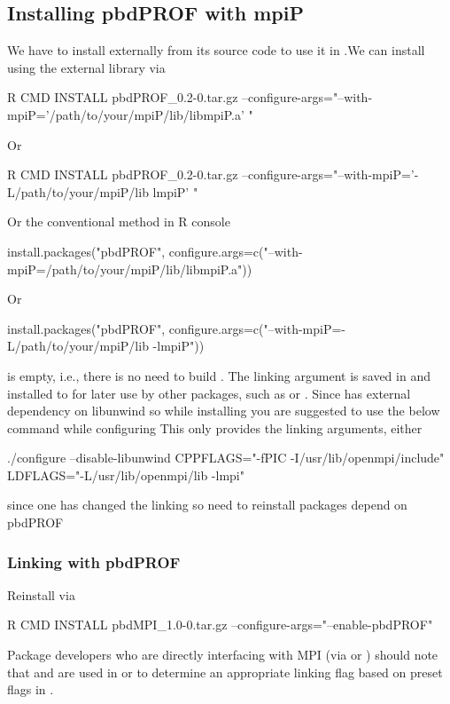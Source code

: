 \subsection{Installing pbdPROF with mpiP}
\label{sec:mpiP}

We have to install  externally from its source code to use it in
.We can install  using the external  library via
\begin{Command}
R CMD INSTALL pbdPROF_0.2-0.tar.gz --configure-args="--with-mpiP='/path/to/your/mpiP/lib/libmpiP.a' "
\end{Command}
Or
\begin{Command}
R CMD INSTALL pbdPROF_0.2-0.tar.gz --configure-args="--with-mpiP='-L/path/to/your/mpiP/lib lmpiP' "
\end{Command}
Or the conventional method in R console
\begin{Command}
install.packages("pbdPROF", configure.args=c("--with-mpiP=/path/to/your/mpiP/lib/libmpiP.a"))
\end{Command}
Or
\begin{Command}
install.packages("pbdPROF", configure.args=c("--with-mpiP=-L/path/to/your/mpiP/lib -lmpiP"))
\end{Command}


 is empty, i.e., there is no need to build .
The linking argument is saved in  and installed to
 for later use by other packages, such as  or .
Since  has external dependency  on libunwind so while installing 
 you are suggested to use the below command while configuring 
This only provides the linking arguments, either
\begin{Code}
./configure --disable-libunwind CPPFLAGS="-fPIC -I/usr/lib/openmpi/include" LDFLAGS="-L/usr/lib/openmpi/lib -lmpi"
\end{Code}
since one has changed the linking so need to reinstall packages depend on pbdPROF



\subsubsection{Linking  with pbdPROF}
\label{sec:pbdMPI}

Reinstall  via
\begin{Command}
R CMD INSTALL pbdMPI_1.0-0.tar.gz --configure-args="--enable-pbdPROF"
\end{Command}
Package developers who are directly interfacing with MPI (via  or ) 
should note that  and  are
used in  or  to determine an
appropriate linking flag  based on preset flags in
.

